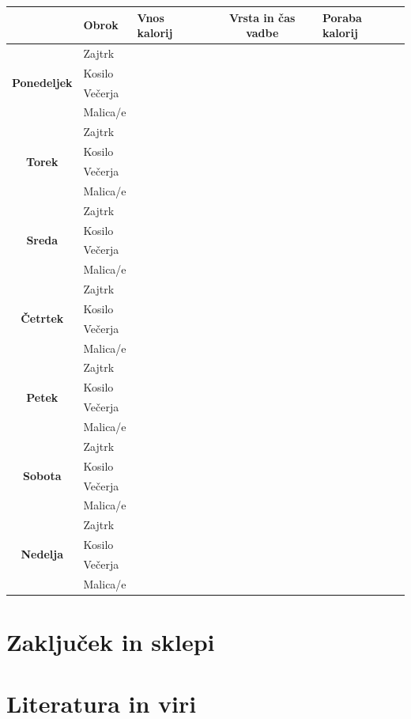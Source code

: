 \documentclass{article}
\begin{document}
\begin{tabularx}{\textwidth}{|c|X|X|c|X|}
  \hline
  & \textbf{Obrok} & \textbf{Vnos kalorij} & \textbf{Vrsta in čas vadbe} & \textbf{Poraba kalorij} \\
  \hline
  \multirow{4}{*}{\textbf{Ponedeljek}} & Zajtrk & & & \\
                                       & Kosilo & & & \\
                                       & Večerja & & & \\
                                       & Malica/e & & & \\
  \hline
  \multirow{4}{*}{\textbf{Torek}}      & Zajtrk & & & \\
                                       & Kosilo & & & \\
                                       & Večerja & & & \\
                                       & Malica/e & & & \\
  \hline
  \multirow{4}{*}{\textbf{Sreda}}      & Zajtrk & & & \\
                                       & Kosilo & & & \\
                                       & Večerja & & & \\
                                       & Malica/e & & & \\
  \hline
  \multirow{4}{*}{\textbf{Četrtek}}    & Zajtrk & & & \\
                                       & Kosilo & & & \\
                                       & Večerja & & & \\
                                       & Malica/e & & & \\
  \hline
  \multirow{4}{*}{\textbf{Petek}}      & Zajtrk & & & \\
                                       & Kosilo & & & \\
                                       & Večerja & & & \\
                                       & Malica/e & & & \\
  \hline
  \multirow{4}{*}{\textbf{Sobota}}     & Zajtrk & & & \\
                                       & Kosilo & & & \\
                                       & Večerja & & & \\
                                       & Malica/e & & & \\
  \hline
  \multirow{4}{*}{\textbf{Nedelja}}    & Zajtrk & & & \\
                                       & Kosilo & & & \\
                                       & Večerja & & & \\
                                       & Malica/e & & & \\
  \hline                                     
\end{tabularx}

\section{Zaključek in sklepi}

\section{Literatura in viri}
\end{document}
